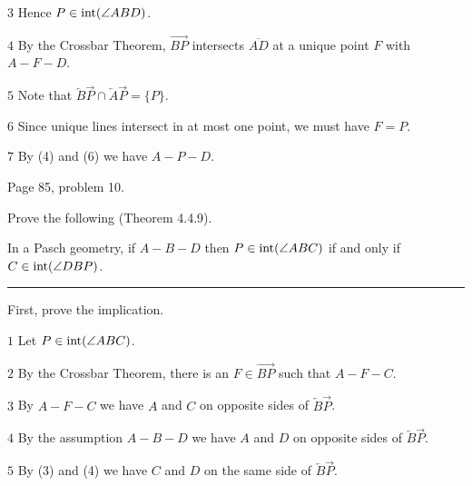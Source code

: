 \medskip
\item{$\scriptstyle3$}
Hence $P\in \mathop{\rm int}\nolimits(\angle ABD)$.

\medskip
\item{$\scriptstyle4$}
By the Crossbar Theorem, $\overrightarrow{BP}$ intersects
$\overline{AD}$ at a unique point $F$ with $A{-}F{-}D$.


\medskip
\item{$\scriptstyle5$}
Note that
$\overleftarrow B\overrightarrow P\cap\overleftarrow A\overrightarrow P=\{P\}$.

\medskip
\item{$\scriptstyle6$}
Since unique lines intersect in at most one point, we must have $F=P$.

\medskip
\item{$\scriptstyle7$}
By (4) and (6) we have $A{-}P{-}D$.

\vfill
\eject

\beginsection Page 85, problem 10.

Prove the following (Theorem 4.4.9).

\medskip
\noindent
In a Pasch geometry, if $A{-}B{-}D$ then $P\in \mathop{\rm int}\nolimits(\angle ABC)$
if and only if $C\in \mathop{\rm int}\nolimits(\angle DBP)$.

\medskip
\hrule
\bigskip

\noindent
First, prove the implication.

\medskip
\item{$\scriptstyle1$} Let $P\in \mathop{\rm int}\nolimits(\angle ABC)$.

\medskip
\item{$\scriptstyle2$}
By the Crossbar Theorem, there is an $F\in\overrightarrow{BP}$ such that $A{-}F{-}C$.

\medskip
\item{$\scriptstyle3$}
By $A{-}F{-}C$ we have $A$ and $C$ on opposite sides of $\overleftarrow B\overrightarrow P$.

\medskip
\item{$\scriptstyle4$}
By the assumption $A{-}B{-}D$ we have
$A$ and $D$ on opposite sides of $\overleftarrow B\overrightarrow P$.

\medskip
\item{$\scriptstyle5$}
By (3) and (4) we have $C$ and $D$ on the same side of $\overleftarrow B\overrightarrow P$.

